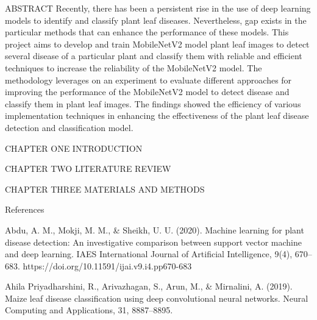 
ABSTRACT 
Recently, there has been a persistent rise in the use of deep learning models to identify and classify plant leaf diseases. Nevertheless, gap exists in the particular methods that can enhance the performance of these models. This project aims to develop and train MobileNetV2 model plant leaf images to detect several disease of a particular plant and classify them with reliable and efficient techniques to increase the reliability of the MobileNetV2 model. The methodology leverages on an experiment to evaluate different approaches for improving the performance of the MobileNetV2 model to detect disease and classify them in plant leaf images. The findings showed the efficiency of various implementation techniques in enhancing the effectiveness of the plant leaf disease detection and classification model.

CHAPTER ONE
INTRODUCTION


CHAPTER TWO
LITERATURE REVIEW




CHAPTER THREE
MATERIALS AND METHODS

	References
	
	Abdu, A. M., Mokji, M. M., \& Sheikh, U. U. (2020). Machine learning for plant disease  
	detection: An investigative comparison between support vector machine and deep learning. IAES International Journal of Artificial Intelligence, 9(4), 670–683. https://doi.org/10.11591/ijai.v9.i4.pp670-683
	
	Ahila Priyadharshini, R., Arivazhagan, S., Arun, M., \& Mirnalini, A. (2019). Maize leaf 
	disease classification using deep convolutional neural networks. Neural Computing and Applications, 31, 8887–8895.
	
